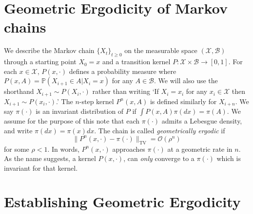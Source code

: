 \documentclass{article}
\newcommand{\X}{\mathcal{X}}
\newcommand{\B}{\mathcal{B}}
\newcommand{\TV}{\text{TV}}
\begin{document}
\section{Geometric Ergodicity of Markov chains}

We describe the Markov chain $\{ X_t \}_{t \geq 0}$ on the measurable space $(\mathcal{X},\mathcal{B})$ through a starting point $X_0 = x$ and a transition kernel $P: \X \times \B \to [0,1]$.  For each $x \in \X$, $P(x,\cdot)$ defines a probability measure where $P(x,A) = \mathbb{P}(X_{i+1} \in A |X_i = x)$ for any $A \in \B$.  We will also use the shorthand $X_{i+1} \sim P(X_i,\cdot)$ rather than writing `If $X_i = x_i$ for any $x_i \in \X$ then $X_{i+1} \sim P(x_i,\cdot)$.'  The $n$-step kernel $P^n(x,A)$ is defined similarly for $X_{i+n}$.  We say $\pi(\cdot)$ is an invariant distribution of $P$ if $\int P(x,A)\pi(dx) = \pi(A)$.  We assume for the purpose of this note that each $\pi(\cdot)$ admits a Lebesgue density, and write $\pi(dx) = \pi(x)dx$.  The chain is called \emph{geometrically ergodic} if
\begin{equation} \label{eqn:geometric_ergodicity}
\| P^n(x,\cdot) - \pi(\cdot) \|_{\TV} = \mathcal{O}(\rho^n)
\end{equation}
for some $\rho < 1$.  In words, $P^n(x,\cdot)$ approaches $\pi(\cdot)$ at a geometric rate in $n$.  As the name suggests, a kernel $P(x,\cdot)$, can \emph{only} converge to a $\pi(\cdot)$ which is invariant for that kernel.

\section{Establishing Geometric Ergodicity}
\end{document}
